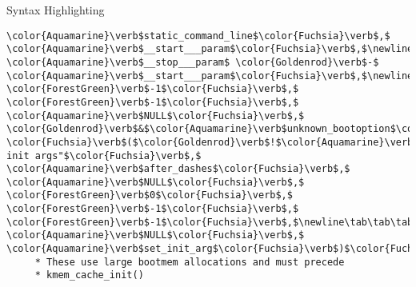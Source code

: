 \begin{frame}{Syntax Highlighting}
\begin{verbatim}
\color{Aquamarine}\verb$static_command_line$\color{Fuchsia}\verb$,$ \color{Aquamarine}\verb$__start___param$\color{Fuchsia}\verb$,$\newline\tab\tab\tab\tab  \color{Aquamarine}\verb$__stop___param$ \color{Goldenrod}\verb$-$ \color{Aquamarine}\verb$__start___param$\color{Fuchsia}\verb$,$\newline\tab\tab\tab\tab  \color{ForestGreen}\verb$-1$\color{Fuchsia}\verb$,$ \color{ForestGreen}\verb$-1$\color{Fuchsia}\verb$,$ \color{Aquamarine}\verb$NULL$\color{Fuchsia}\verb$,$ \color{Goldenrod}\verb$&$\color{Aquamarine}\verb$unknown_bootoption$\color{Fuchsia}\verb$)$\color{Fuchsia}\verb$;$\newline\tab\color{BurntOrange}\verb$if$ \color{Fuchsia}\verb$($\color{Goldenrod}\verb$!$\color{Aquamarine}\verb$IS_ERR_OR_NULL$\color{Fuchsia}\verb$($\color{Aquamarine}\verb$after_dashes$\color{Fuchsia}\verb$)$\color{Fuchsia}\verb$)$\newline\tab\tab\color{Aquamarine}\verb$parse_args$\color{Fuchsia}\verb$($\color{Emerald}\verb$"Setting init args"$\color{Fuchsia}\verb$,$ \color{Aquamarine}\verb$after_dashes$\color{Fuchsia}\verb$,$ \color{Aquamarine}\verb$NULL$\color{Fuchsia}\verb$,$ \color{ForestGreen}\verb$0$\color{Fuchsia}\verb$,$ \color{ForestGreen}\verb$-1$\color{Fuchsia}\verb$,$ \color{ForestGreen}\verb$-1$\color{Fuchsia}\verb$,$\newline\tab\tab\tab   \color{Aquamarine}\verb$NULL$\color{Fuchsia}\verb$,$ \color{Aquamarine}\verb$set_init_arg$\color{Fuchsia}\verb$)$\color{Fuchsia}\verb$;$\newline\newline\tab\color{Aquamarine}\verb$jump_label_init$\color{Fuchsia}\verb$($\color{Fuchsia}\verb$)$\color{Fuchsia}\verb$;$\newline\newline\tab\color{Rhodamine}\begin{verbatim}/*
	 * These use large bootmem allocations and must precede
	 * kmem_cache_init()

\end{verbatim}
\end{frame}
